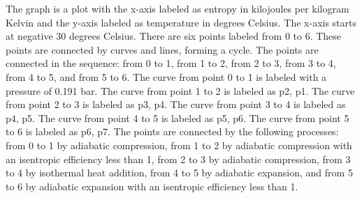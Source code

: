 The graph is a plot with the x-axis labeled as entropy in kilojoules per kilogram Kelvin and the y-axis labeled as temperature in degrees Celsius. The x-axis starts at negative 30 degrees Celsius. There are six points labeled from 0 to 6. These points are connected by curves and lines, forming a cycle. The points are connected in the sequence: from 0 to 1, from 1 to 2, from 2 to 3, from 3 to 4, from 4 to 5, and from 5 to 6. The curve from point 0 to 1 is labeled with a pressure of 0.191 bar. The curve from point 1 to 2 is labeled as p2, p1. The curve from point 2 to 3 is labeled as p3, p4. The curve from point 3 to 4 is labeled as p4, p5. The curve from point 4 to 5 is labeled as p5, p6. The curve from point 5 to 6 is labeled as p6, p7. The points are connected by the following processes: from 0 to 1 by adiabatic compression, from 1 to 2 by adiabatic compression with an isentropic efficiency less than 1, from 2 to 3 by adiabatic compression, from 3 to 4 by isothermal heat addition, from 4 to 5 by adiabatic expansion, and from 5 to 6 by adiabatic expansion with an isentropic efficiency less than 1.